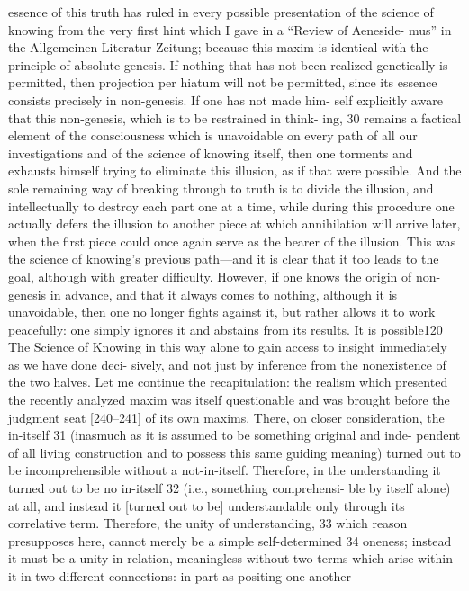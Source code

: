 essence of this truth has ruled in every possible presentation of the science
of knowing from the very first hint which I gave in a “Review of Aeneside-
mus” in the Allgemeinen Literatur Zeitung; because this maxim is identical
with the principle of absolute genesis. If nothing that has not been realized
genetically is permitted, then projection per hiatum will not be permitted,
since its essence consists precisely in non-genesis. If one has not made him-
self explicitly aware that this non-genesis, which is to be restrained in think-
ing, 30 remains a factical element of the consciousness which is unavoidable
on every path of all our investigations and of the science of knowing itself,
then one torments and exhausts himself trying to eliminate this illusion, as
if that were possible. And the sole remaining way of breaking through to
truth is to divide the illusion, and intellectually to destroy each part one at
a time, while during this procedure one actually defers the illusion to
another piece at which annihilation will arrive later, when the first piece
could once again serve as the bearer of the illusion. This was the science of
knowing’s previous path—and it is clear that it too leads to the goal,
although with greater difficulty. However, if one knows the origin of non-
genesis in advance, and that it always comes to nothing, although it is
unavoidable, then one no longer fights against it, but rather allows it to work
peacefully: one simply ignores it and abstains from its results. It is possible120
The Science of Knowing
in this way alone to gain access to insight immediately as we have done deci-
sively, and not just by inference from the nonexistence of the two halves.
Let me continue the recapitulation: the realism which presented the
recently analyzed maxim was itself questionable and was brought before the
judgment seat [240–241] of its own maxims. There, on closer consideration,
the in-itself 31 (inasmuch as it is assumed to be something original and inde-
pendent of all living construction and to possess this same guiding meaning)
turned out to be incomprehensible without a not-in-itself. Therefore, in the
understanding it turned out to be no in-itself 32 (i.e., something comprehensi-
ble by itself alone) at all, and instead it [turned out to be] understandable only
through its correlative term. Therefore, the unity of understanding, 33 which
reason presupposes here, cannot merely be a simple self-determined 34 oneness;
instead it must be a unity-in-relation, meaningless without two terms which
arise within it in two different connections: in part as positing one another
